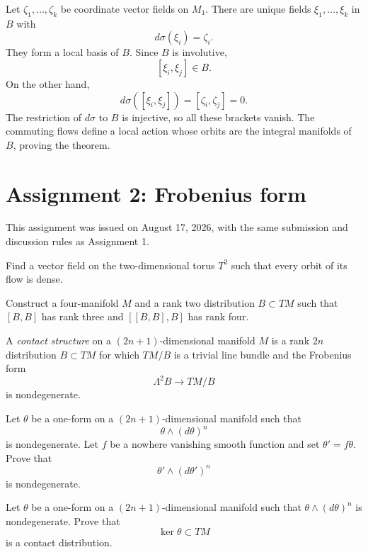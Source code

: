 Let $\zeta_1,\ldots,\zeta_k$ be coordinate
vector fields on $M_1$. There are unique
fields $\xi_1,\ldots,\xi_k$ in $B$ with
$$
d\sigma(\xi_i)=\zeta_i.
$$
They form a local basis of $B$. Since $B$
is involutive,
$$
[\xi_i,\xi_j]\in B.
$$
On the other hand,
$$
d\sigma([\xi_i,\xi_j])
=[\zeta_i,\zeta_j]=0.
$$
The restriction of $d\sigma$ to $B$ is
injective, so all these brackets vanish.
The commuting flows define a local action
whose orbits are the integral manifolds of
$B$, proving the theorem.

\section{Assignment 2: Frobenius form}
\label{section-assignment-two-frobenius}

\noindent
This assignment was issued on August 17,
2026, with the same submission and
discussion rules as Assignment 1.

\begin{exercise}
\label{exercise-dense-torus-flow}
Find a vector field on the two-dimensional
torus $T^2$ such that every orbit of its
flow is dense.
\end{exercise}

\begin{exercise}
\label{exercise-bracket-growth}
Construct a four-manifold $M$ and a rank
two distribution $B\subset TM$ such that
$[B,B]$ has rank three and $[[B,B],B]$ has
rank four.
\end{exercise}

\begin{definition}
\label{definition-contact-structure}
A {\it contact structure} on a
$(2n+1)$-dimensional manifold $M$ is a rank
$2n$ distribution $B\subset TM$ for which
$TM/B$ is a trivial line bundle and the
Frobenius form
$$
\Lambda^2B\longrightarrow TM/B
$$
is nondegenerate.
\end{definition}

\begin{exercise}
\label{exercise-rescale-contact-form}
Let $\theta$ be a one-form on a
$(2n+1)$-dimensional manifold such that
$$
\theta\wedge(d\theta)^n
$$
is nondegenerate. Let $f$ be a nowhere
vanishing smooth function and set
$\theta'=f\theta$. Prove that
$$
\theta'\wedge(d\theta')^n
$$
is nondegenerate.
\end{exercise}

\begin{exercise}
\label{exercise-kernel-contact}
Let $\theta$ be a one-form on a
$(2n+1)$-dimensional manifold such that
$\theta\wedge(d\theta)^n$ is nondegenerate.
Prove that
$$
\ker\theta\subset TM
$$
is a contact distribution.
\end{exercise}

